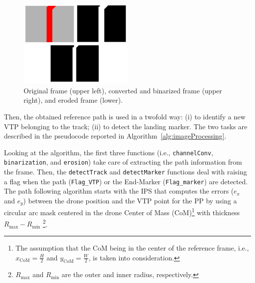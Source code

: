 \documentclass[a4paper,twocolumn,10pt]{article}
\begin{document}
    \begin{figure}
        \centering
        \includegraphics[width=0.5\textwidth]{pics/fig6_track.jpg}
        \caption{Original frame (upper left),  converted and binarized frame (upper right), and eroded frame (lower).}
        \label{fig:preprocessing}
    \end{figure}

    Then, the obtained reference path is used in a twofold way: (i) to identify a new VTP 
    belonging to the track; (ii) to detect the landing marker. The two tasks are described in the 
    pseudocode reported in Algorithm~\ref{alg:imageProcessing}.

    Looking at the algorithm, the first three functions (i.e., \texttt{channelConv}, 
    \texttt{binarization}, and \texttt{erosion}) take care of extracting the path information from the 
    frame. Then, the \texttt{detectTrack} and \texttt{detectMarker} functions deal with raising a flag 
    when the path (\texttt{Flag\_VTP}) or the End-Marker (\texttt{Flag\_marker}) are detected. The path 
    following algorithm starts with the IPS that computes the errors ($e_x$ and $e_y$) between the 
    drone position and the VTP point for the PP by using a circular arc mask centered in the 
    drone Center of Mass (CoM)\footnote{The assumption that the CoM being in the center of the reference 
    frame, i.e., $x_\mathrm{CoM} = \frac{H}{2}$ and $y_\mathrm{CoM}=\frac{W}{2}$, is taken into 
    consideration.} with thickness $R_\mathrm{max} - R_\mathrm{min}$
    \footnote{$R_\mathrm{max}$ and $R_\mathrm{min}$ are the outer and inner radius, respectively.}. 
\end{document}
